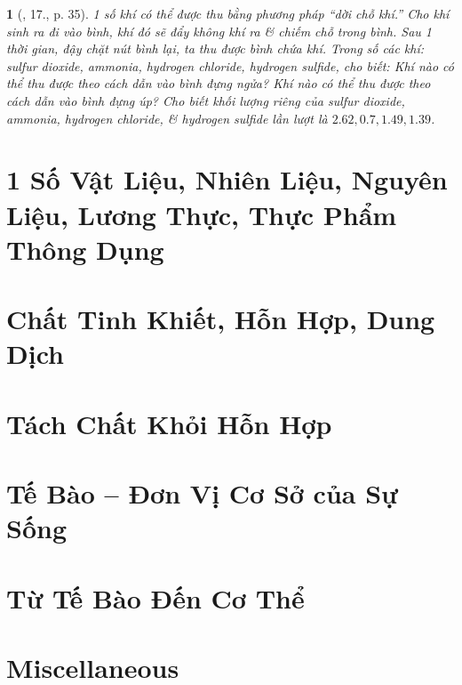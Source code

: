 \documentclass{article}
\newtheorem{baitoan}{}
\begin{document}
\begin{baitoan}[\cite{ncpt_KHTN_6_tap_1}, 17., p. 35]
	1 số khí có thể được thu bằng phương pháp ``dời chỗ khí.'' Cho khí sinh ra đi vào bình, khí đó sẽ đẩy không khí ra \& chiếm chỗ trong bình. Sau 1 thời gian, đậy chặt nút bình lại, ta thu được bình chứa khí. Trong số các khí: sulfur dioxide, ammonia, hydrogen chloride, hydrogen sulfide, cho biết: Khí nào có thể thu được theo cách dẫn vào bình đựng ngửa? Khí nào có thể thu được theo cách dẫn vào bình đựng úp? Cho biết khối lượng riêng của sulfur dioxide, ammonia, hydrogen chloride, \& hydrogen sulfide lần lượt là $2.62,0.7,1.49,1.39$.
\end{baitoan}


\section{1 Số Vật Liệu, Nhiên Liệu, Nguyên Liệu, Lương Thực, Thực Phẩm Thông Dụng}


\section{Chất Tinh Khiết, Hỗn Hợp, Dung Dịch}


\section{Tách Chất Khỏi Hỗn Hợp}


\section{Tế Bào -- Đơn Vị Cơ Sở của Sự Sống}


\section{Từ Tế Bào Đến Cơ Thể}


\section{Miscellaneous}


\printbibliography[heading=bibintoc]
	
\end{document}
